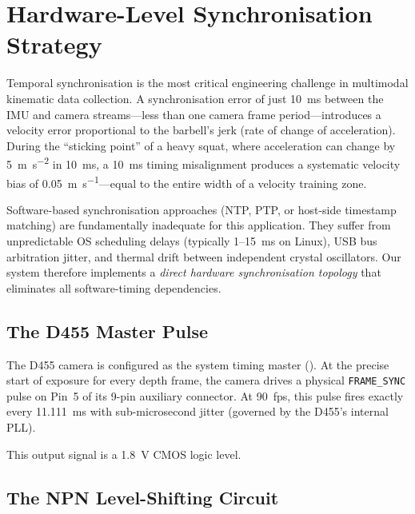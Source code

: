 \section{Hardware-Level Synchronisation Strategy}\label{sec:sync}

Temporal synchronisation is the most critical engineering challenge in multimodal kinematic data collection.
A synchronisation error of just \SI{10}{\milli\second} between the IMU and camera streams---less than one camera frame period---introduces a velocity error proportional to the barbell's jerk (rate of change of acceleration).
During the ``sticking point'' of a heavy squat, where acceleration can change by \SI{5}{\metre\per\second\squared} in \SI{10}{\milli\second}, a \SI{10}{\milli\second} timing misalignment produces a systematic velocity bias of \SI{0.05}{\metre\per\second}---equal to the entire width of a velocity training zone.

Software-based synchronisation approaches (NTP, PTP, or host-side timestamp matching) are fundamentally inadequate for this application.
They suffer from unpredictable OS scheduling delays (typically \SI{1}{}--\SI{15}{\milli\second} on Linux), USB bus arbitration jitter, and thermal drift between independent crystal oscillators.
Our system therefore implements a \emph{direct hardware synchronisation topology} that eliminates all software-timing dependencies.


\subsection{The D455 Master Pulse}

The D455 camera is configured as the system timing master ().
At the precise start of exposure for every depth frame, the camera drives a physical \texttt{FRAME\_SYNC} pulse on Pin~5 of its 9-pin auxiliary connector.
At \SI{90}{fps}, this pulse fires exactly every \SI{11.111}{\milli\second} with sub-microsecond jitter (governed by the D455's internal PLL).

This output signal is a \SI{1.8}{\volt} CMOS logic level.


\subsection{The NPN Level-Shifting Circuit}\label{sec:level_shifter}

